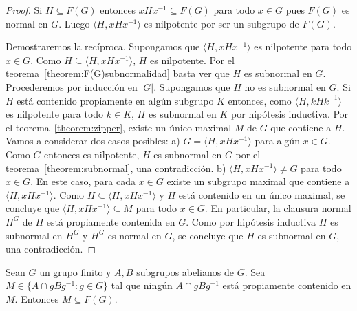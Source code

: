 \begin{proof}
	Si $H\subseteq F(G)$ entonces $xHx^{-1}\subseteq F(G)$ para todo $x\in G$
	pues $F(G)$ es normal en $G$. Luego $\langle H,xHx^{-1}\rangle$ es
	nilpotente por ser un subgrupo de $F(G)$.

	Demostraremos la recíproca. Supongamos que $\langle H,xHx^{-1}\rangle$ es nilpotente para todo $x\in
	G$. Como $H\subseteq \langle H,xHx^{-1}\rangle$, $H$ es nilpotente. Por el
	teorema~\ref{theorem:F(G)subnormalidad} basta ver que $H$ es subnormal en
	$G$. Procederemos por inducción en $|G|$. Supongamos que $H$ no es subnormal en $G$. 
	Si $H$ está contenido propiamente en algún subgrupo $K$ entonces, como
	$\langle H,kHk^{-1}\rangle$ es nilpotente para todo $k\in K$, $H$ es
	subnormal en $K$ por hipótesis inductiva. Por el
	teorema~\ref{theorem:zipper}, existe un único maximal $M$ de $G$ que
	contiene a $H$. 
	Vamos a considerar dos casos posibles: a) $G=\langle H,xHx^{-1}\rangle$
	para algún $x\in G$. Como $G$ entonces es nilpotente, $H$ es subnormal en
	$G$ por el teorema~\ref{theorem:subnormal}, una contradicción. 
	b) $\langle H,xHx^{-1}\rangle\ne G$ para todo $x\in G$. En este caso, para
	cada $x\in G$ existe un subgrupo maximal que contiene a $\langle
	H,xHx^{-1}\rangle$. Como $H\subseteq \langle H,xHx^{-1}\rangle$ y $H$
	está contenido en un único maximal, se concluye que $\langle
	H,xHx^{-1}\rangle\subseteq M$ para todo $x\in G$. En particular, la
	clausura normal $H^G$ de $H$ está propiamente contenida en $G$. Como por
	hipótesis inductiva $H$ es subnormal en $H^G$ y $H^G$ es normal en $G$, se
	concluye que $H$ es subnormal en $G$, una contradicción.
\end{proof}

\begin{theorem}[Zenkov]
	\label{theorem:Zenkov}
	Sean $G$ un grupo finito y $A,B$ subgrupos abelianos de $G$. Sea 
	$M\in\{A\cap gBg^{-1}:g\in G\}$ tal que ningún $A\cap gBg^{-1}$ está propiamente
	contenido en $M$. Entonces $M\subseteq F(G)$.
\end{theorem}

